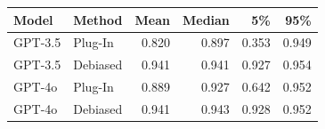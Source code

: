 
\begin{tabular}{llrrrr}
\toprule
Model & Method & Mean & Median & 5\% & 95\%\\
\midrule
GPT-3.5 & Plug-In & 0.820 & 0.897 & 0.353 & 0.949\\
GPT-3.5 & Debiased & 0.941 & 0.941 & 0.927 & 0.954\\
\midrule
GPT-4o & Plug-In & 0.889 & 0.927 & 0.642 & 0.952\\
GPT-4o & Debiased & 0.941 & 0.943 & 0.928 & 0.952\\
\bottomrule
\end{tabular}
